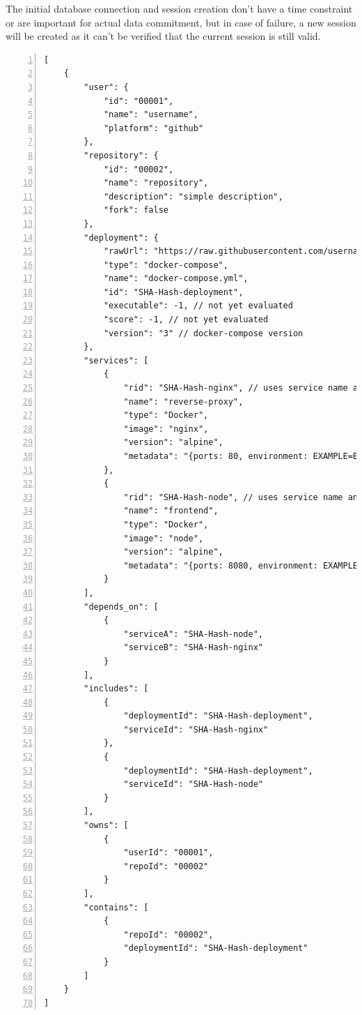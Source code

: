 The initial database connection and session creation don't have a time constraint or are important for actual data commitment, but in case of failure, a new session will be created as it can't be verified that the current session is still valid.

\begin{lstlisting}[caption=Process response, breaklines=true, label=lst:process_response, numbers=left,  basicstyle=\footnotesize\singlespacing]
[
    {
        "user": {
            "id": "00001",
            "name": "username",
            "platform": "github"
        },
        "repository": {
            "id": "00002",
            "name": "repository",
            "description": "simple description",
            "fork": false
        },
        "deployment": {
            "rawUrl": "https://raw.githubusercontent.com/username/repository/...",
            "type": "docker-compose",
            "name": "docker-compose.yml",
            "id": "SHA-Hash-deployment",
            "executable": -1, // not yet evaluated
            "score": -1, // not yet evaluated
            "version": "3" // docker-compose version
        },
        "services": [
            {
                "rid": "SHA-Hash-nginx", // uses service name and deployment id
                "name": "reverse-proxy",
                "type": "Docker",
                "image": "nginx",
                "version": "alpine",
                "metadata": "{ports: 80, environment: EXAMPLE=EXAMPLE, command: nginx}"
            },
            {
                "rid": "SHA-Hash-node", // uses service name and deployment id
                "name": "frontend",
                "type": "Docker",
                "image": "node",
                "version": "alpine",
                "metadata": "{ports: 8080, environment: EXAMPLE=EXAMPLE, command: node index.js}"
            }
        ],
        "depends_on": [
            {
                "serviceA": "SHA-Hash-node",
                "serviceB": "SHA-Hash-nginx"
            }
        ],
        "includes": [
            {
                "deploymentId": "SHA-Hash-deployment",
                "serviceId": "SHA-Hash-nginx"
            },
            {
                "deploymentId": "SHA-Hash-deployment",
                "serviceId": "SHA-Hash-node"
            }
        ],
        "owns": [
            {
                "userId": "00001",
                "repoId": "00002"
            }
        ],
        "contains": [
            {
                "repoId": "00002",
                "deploymentId": "SHA-Hash-deployment"
            }
        ]
    }
]
\end{lstlisting}

